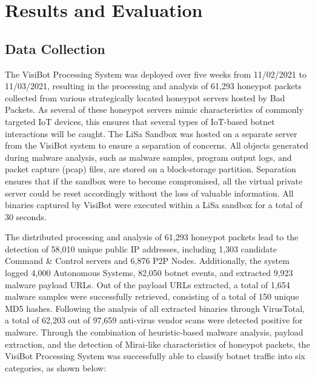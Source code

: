 
\chapter{Results and Evaluation}

\section{Data Collection}

The VisiBot Processing System was deployed over five weeks from 11/02/2021 to 11/03/2021, resulting in the processing and analysis of 61,293 honeypot packets collected from various strategically located honeypot servers hosted by Bad Packets. As several of these honeypot servers mimic characteristics of commonly targeted IoT devices, this ensures that several types of IoT-based botnet interactions will be caught. The LiSa Sandbox was hosted on a separate server from the VisiBot system to ensure a separation of concerns. All objects generated during malware analysis, such as malware samples, program output logs, and packet capture (pcap) files, are stored on a block-storage partition. Separation ensures that if the sandbox were to become compromised, all the virtual private server could be reset accordingly without the loss of valuable information. All binaries captured by VisiBot were executed within a LiSa sandbox for a total of 30 seconds. 

The distributed processing and analysis of 61,293 honeypot packets lead to the detection of 58,010 unique public IP addresses, including 1,303 candidate Command \& Control servers and 6,876 P2P Nodes. Additionally, the system logged 4,000 Autonomous Systems, 82,050 botnet events, and extracted 9,923 malware payload URLs. Out of the payload URLs extracted, a total of 1,654 malware samples were successfully retrieved, consisting of a total of 150 unique MD5 hashes. Following the analysis of all extracted binaries through VirusTotal, a total of 62,203 out of 97,659 anti-virus vendor scans were detected positive for malware. Through the combination of heuristic-based malware analysis, payload extraction, and the detection of Mirai-like characteristics of honeypot packets, the VisiBot Processing System was successfully able to classify botnet traffic into six categories, as shown below: 

